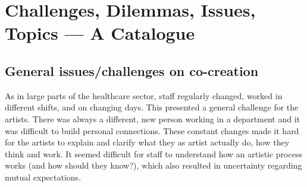 \documentclass[authordate, empirical]{jote-new-article}
\begin{document}
	\section{Challenges, Dilemmas, Issues, Topics --- A Catalogue}
	
	
	

	\subsection{General issues/challenges on co-creation}



	As in large parts of the healthcare sector, staff regularly changed, worked in different shifts, and on changing days. This presented a general challenge for the artists. There was always a different, new person working in a department and it was difficult to build personal connections. These constant changes made it hard for the artists to explain and clarify what they as artist actually do, how they think and work. It seemed difficult for staff to understand how an artistic process works (and how should they know?), which also resulted in uncertainty regarding mutual expectations.
\end{document}

